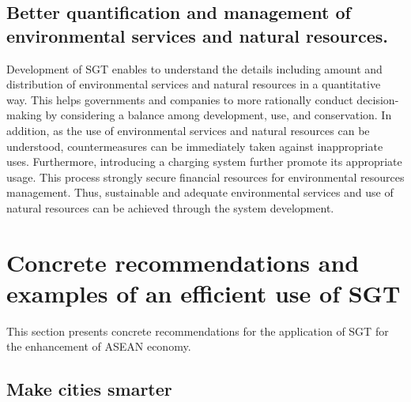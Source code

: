 \subsection{Better quantification and management of environmental services and natural resources.}

\tab Development of SGT enables to understand the details including amount and distribution of environmental services and natural resources in a quantitative way. This helps governments and companies to more rationally conduct decision-making by considering a balance among development, use, and conservation. In addition, as the use of environmental services and natural resources can be understood, countermeasures can be immediately taken against inappropriate uses. Furthermore, introducing a charging system further promote its appropriate usage. This process strongly secure financial resources for environmental resources management. Thus, sustainable and adequate environmental services and use of natural resources can be achieved through the system development.





\section{Concrete recommendations and examples of an efficient use of SGT}

\tab This section presents concrete recommendations for the application of SGT for the enhancement of ASEAN economy.

\subsection{Make cities smarter}

